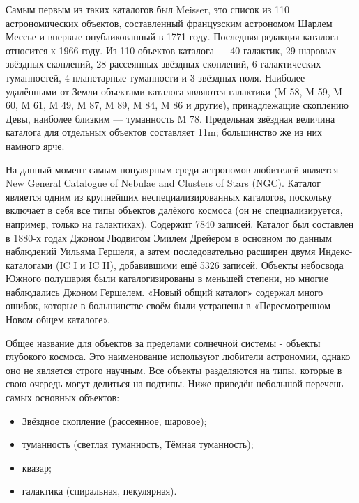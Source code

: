 \documentclass[14pt]{extreport}
\begin{document}
{        Самым первым из таких каталогов был Meisser, это список из 110 астрономических объектов, составленный французским астрономом Шарлем Мессье и впервые опубликованный в 1771 году. Последняя редакция каталога относится к 1966 году. Из 110 объектов каталога — 40 галактик, 29 шаровых звёздных скоплений, 28 рассеянных звёздных скоплений, 6 галактических туманностей, 4 планетарные туманности и 3 звёздных поля. Наиболее удалёнными от Земли объектами каталога являются галактики (M 58, M 59, M 60, M 61, M 49, M 87, M 89, M 84, M 86 и другие), принадлежащие скоплению Девы, наиболее близким — туманность M 78. Предельная звёздная величина каталога для отдельных объектов составляет 11m; большинство же из них намного ярче. 
        
        На данный момент самым популярным среди астрономов-любителей является  New General Catalogue of Nebulae and Clusters of Stars (NGC). Каталог является одним из крупнейших неспециализированных каталогов, поскольку включает в себя все типы объектов далёкого космоса (он не специализируется, например, только на галактиках). Содержит 7840 записей. Каталог был составлен в 1880-х годах Джоном Людвигом Эмилем Дрейером в основном по данным наблюдений Уильяма Гершеля, а затем последовательно расширен двумя Индекс-каталогами (IC I и IC II), добавившими ещё 5326 записей. Объекты небосвода Южного полушария были каталогизированы в меньшей степени, но многие наблюдались Джоном Гершелем. «Новый общий каталог» содержал много ошибок, которые в большинстве своём были устранены в «Пересмотренном Новом общем каталоге».

        Общее название для объектов за пределами солнечной системы - объекты глубокого космоса. Это наименование используют любители астрономии, однако оно не является строго научным. Все объекты разделяются на типы, которые в свою очередь могут делиться на подтипы. Ниже приведён небольшой перечень самых основных объектов:
        
        \begin{itemize}
            \item Звёздное скопление (рассеянное, шаровое);
            
            \item туманность (светлая туманность, Тёмная туманность);
            
            \item квазар;
            
            \item галактика (спиральная, пекулярная).
            

\end{itemize}}
\end{document}
